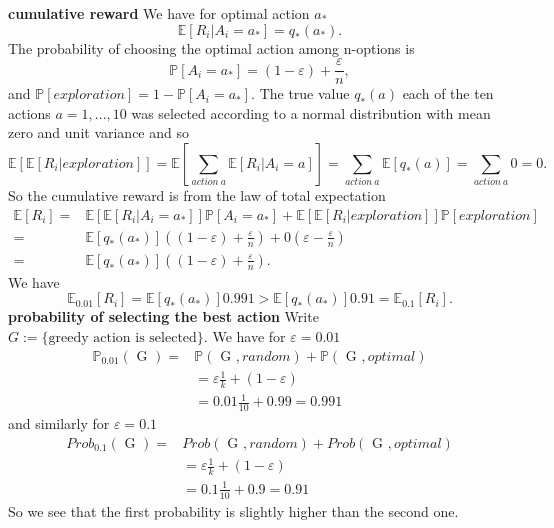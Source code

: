 \documentclass[answers]{exam}
\theoremstyle{definition}
\theoremstyle{remark}
\newcommand{\Prob}{\mathbb{P}}
\newcommand{\Proba}[1]{\mathbb{P}\left[#1\right]}
\newcommand{\Exp}{\mathbb{E}}
\newcommand{\Expe}[1]{\mathbb{E}\left[ #1\right] }
\newcommand{\e}{\varepsilon}
\begin{document}
\begin{solution}\textbf{ cumulative reward} We have for optimal action $a_{*}$
\begin{equation}
\Expe{R_{i}|A_{i}=a_{*}}=q_{*}(a_{*}).    
\end{equation}
The probability of choosing the optimal action among n-options is
\begin{equation}
\Proba{A_{i}=a_{*}}=(1-\e)+\frac{\e}{n},
\end{equation}
and $\Proba{exploration}=1- \Proba{A_{i}=a_{*}}$. The true value $q_{*}(a)$ each of the ten actions $a=1,...,10$ was selected according to a normal distribution with mean zero and unit variance and so
\begin{equation}
\Expe{\Expe{R_{i}|exploration}}=\Expe{\sum_{action~a}\Expe{R_{i}|A_{i}=a}} =\sum_{action~a}\Expe{q_{*}(a)}=\sum_{action~a}0=0.   
\end{equation}
So the cumulative reward is from the law of total expectation
\begin{align*}
\Expe{R_{i}}=&\Expe{\Expe{R_{i}|A_{i}=a_{*}}}\Proba{A_{i}=a_{*}}+\Expe{\Expe{R_{i}|exploration}}\Proba{exploration}\\    
=&\Expe{q_{*}(a_{*})}((1-\e)+\frac{\e}{n})+0(\e-\frac{\e}{n})\\   
=&\Expe{q_{*}(a_{*})}((1-\e)+\frac{\e}{n}).
\end{align*}
We have
\begin{equation}
\Exp_{0.01}[R_{i}]=\Expe{q_{*}(a_{*})}0.991>\Expe{q_{*}(a_{*})}0.91=\Exp_{0.1}[R_{i}].   
\end{equation}
\textbf{probability of selecting the best action}
Write $G:=\{\text{greedy action is selected}\}$. We have for $\e=0.01$
\begin{align*}
\Prob_{0.01}(\text{ G })=&\Prob(\text{ G },random)+\Prob(\text{ G },optimal)    \\
&=\e\frac{1}{k}+(1-\e)\\
&=0.01\frac{1}{10}+0.99=0.991
\end{align*}  
and similarly for $\e=0.1$
\begin{align*}
Prob_{0.1}(\text{ G })=&Prob(\text{ G },random)+Prob(\text{ G },optimal)    \\
&=\e\frac{1}{k}+(1-\e)\\
&=0.1\frac{1}{10}+0.9=0.91
\end{align*}  
So we see that the first probability is slightly higher than the second one.



\end{solution}
\end{document}
